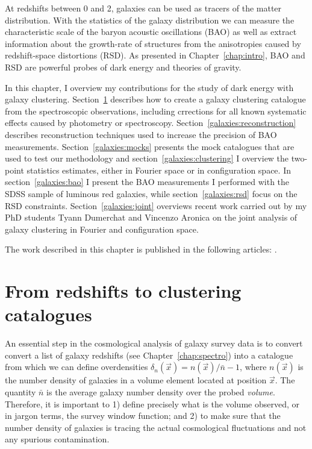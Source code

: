 \chaptertoc{}

\vspace{1em}

At redshifts between 0 and 2, galaxies can be used as tracers of
the matter distribution. With the statistics of the galaxy distribution 
we can measure the characteristic scale of the baryon acoustic oscillations (BAO) 
as well as extract information about the growth-rate of structures from 
the anisotropies caused by redshift-space distortions (RSD). 
As presented in Chapter~\ref{chap:intro}, BAO and RSD are powerful 
probes of dark energy and theories of gravity. 

In this chapter, I overview my contributions for the study of dark energy 
with galaxy clustering. Section~\ref{galaxies:catalogue} describes how to 
create a galaxy clustering catalogue from the spectroscopic observations, 
including crrections for all known systematic effects caused by photometry 
or spectroscopy.
Section~\ref{galaxies:reconstruction} describes reconstruction techniques
used to increase the precision of BAO measurements. 
Section~\ref{galaxies:mocks} presents the mock catalogues that are used to 
test our methodology and section~\ref{galaxies:clustering} I overview the 
two-point statistics estimates, either in Fourier space or in configuration space.  
In section~\ref{galaxies:bao} I present the BAO measurements I performed 
with the SDSS sample of luminous red galaxies, while section~\ref{galaxies:rsd}
focus on the RSD constraints. Section~\ref{galaxies:joint} 
overviews recent work carried out by my PhD students Tyann Dumerchat 
and Vincenzo Aronica on the joint analysis of galaxy clustering in 
Fourier and configuration space. 

The work described in this chapter is published in the following 
articles: 
\cite{bautistaSDSSIVExtendedBaryon2018, 
bautistaCompletedSDSSIVExtended2021,
gil-marinCompletedSDSSIVExtended2020,
rossCompletedSDSSIVExtended2020,
zhaoCompletedSDSSIVExtended2021,
dumerchatBaryonAcousticOscillations2022a}. 

\section{From redshifts to clustering catalogues}
\label{galaxies:catalogue}

An essential step in the cosmological analysis of galaxy survey data is 
to convert convert a list of galaxy redshifts (see Chapter~\ref{chap:spectro}) 
into a catalogue from which we can define overdensities 
$\delta_n(\vec{x}) = n(\vec{x})/\bar{n} - 1$, where $n(\vec{x})$ is the 
number density 
of galaxies in a volume element located at position $\vec{x}$. 
The quantity $\bar{n}$ is the average galaxy number density over the probed 
\emph{volume}. Therefore, it is important to 1) define precisely what is the 
volume observed, or in jargon terms, the survey window function; and 
2) to make sure that the number density of galaxies is tracing the actual 
cosmological fluctuations and not any spurious contamination. 

